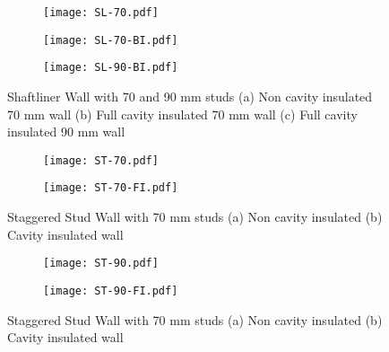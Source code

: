 \begin{figure}[!htbp]
	\centering
	\begin{subfigure}[b]{0.25\textwidth}
		\centering
		\texttt{[image: SL-70.pdf]}
		\caption{}
		\label{subfig:SL-70}
	\end{subfigure}
	\begin{subfigure}[b]{0.25\textwidth}
		\centering
		\texttt{[image: SL-70-BI.pdf]}
		\caption{}
		\label{subfig:SL-70-BI}
	\end{subfigure}
	\begin{subfigure}[b]{0.25\textwidth}
		\centering
		\texttt{[image: SL-90-BI.pdf]}
		\caption{}
		\label{subfig:SL-90-BI}
	\end{subfigure}
	   \caption{Shaftliner Wall with 70 and 90 mm studs (a) Non cavity insulated 70 mm wall (b) Full cavity insulated 70 mm wall (c) Full cavity insulated 90 mm wall}
	   \label{fig:SL-70-90-parametric}
\end{figure} 
\begin{figure}[!htbp]
	\centering
	\begin{subfigure}[b]{0.35\textwidth}
		\centering
		\texttt{[image: ST-70.pdf]}
		\caption{}
		\label{subfig:ST-70}
	\end{subfigure}
	\begin{subfigure}[b]{0.35\textwidth}
		\centering
		\texttt{[image: ST-70-FI.pdf]}
		\caption{}
		\label{subfig:ST-70-FI}
	\end{subfigure}
	   \caption{Staggered Stud Wall with 70 mm studs (a) Non cavity insulated (b) Cavity insulated wall}
	   \label{fig:ST-70-parametric}
\end{figure} 
\begin{figure}[!htbp]
	\centering
	\begin{subfigure}[b]{0.35\textwidth}
		\centering
		\texttt{[image: ST-90.pdf]}
		\caption{}
		\label{subfig:ST-90}
	\end{subfigure}
	\begin{subfigure}[b]{0.35\textwidth}
		\centering
		\texttt{[image: ST-90-FI.pdf]}
		\caption{}
		\label{subfig:ST-90-FI}
	\end{subfigure}
	   \caption{Staggered Stud Wall with 70 mm studs (a) Non cavity insulated (b) Cavity insulated wall}
	   \label{fig:ST-90-parametric}
\end{figure} 

